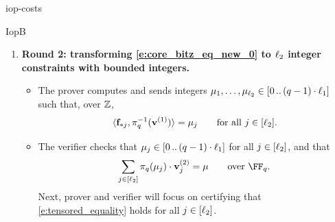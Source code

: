 \begin{lncsappendix}{iop-costs}
\begin{lncsmove}{IopB}
\begin{construction}
\begin{enumerate}[leftmargin=*]
\iflncs Round 1 can also be skipped when $R=\ZZ$ and $\lVert \vv\rVert_{\infty}$ is ``small'', see \cref{r:skip_round_1_integers}.\else
\begin{remark}[Skipping Round 1 when $R=\ZZ$ and $\lVert \vv\rVert_{\infty}$ is ``small'']\label{r:skip_round_1_integers}
    This step can also be skipped when $R=\ZZ$ and all entries of $\vv^{(1)}$ are nonnegative and less than $\fieldboundsizeexponent$. In that case the claim to prove at the start of Round 2 is $\langle \vv^{(1)} \otimes \vv^{(2)}, \bff\rangle = \mu $ over $\ZZ$. In this case the map $\pi_q$ in Round 2 is simply replaced by the identity map, $\FF_q$ is replaced by $\ZZ$, and $q$ in the range checks of Round 2 denotes $\max_{i\in [\codedim_1]} \vv^{(1)}_i+1$. In Phase 3, $\bm{\gamma}$ is  $\vv^{(1)}$. 
\end{remark}
\fi
\item \textbf{Round 2: transforming \eqref{e:core_bitz_eq_new_0} to $\ell_2$ integer constraints with bounded integers.}
\iflncs\else\begin{itemize}[leftmargin=*]\fi
    \iflncs\else\item\fi{} The prover computes and sends integers $\mu_1, \ldots, \mu_{\ell_2}\in [0 \, .. \, (q-1)\cdot \ell_1]$ such that, over $\ZZ$, \begin{equation}\label{e:tensored_equality}\langle \mathbf{f}_{*j}, \pi_q^{-1}(\mathbf{v}^{(1)})\rangle = \mu_j \qquad \text{for all } j\in [\ell_2].\end{equation} 
\iflncs\else\item\fi{} The verifier checks that $\mu_j\in [0 \, .. \, (q-1)\cdot \ell_1]$ for all $j\in [\ell_2]$, and that \begin{equation}\label{e:tensor_decomposition_reconstruction}\sum_{j\in [\codedim_2]} \pi_q(\mu_j)\cdot \vv_j^{(2)}  = \mu\qquad \text{over } \FF_q.\end{equation} 
Next, prover and verifier will focus on certifying that \eqref{e:tensored_equality} holds for all $j\in [\ell_2]$.


\end{itemize}
\end{enumerate}
\end{construction}
\end{lncsmove}
\end{lncsappendix}
